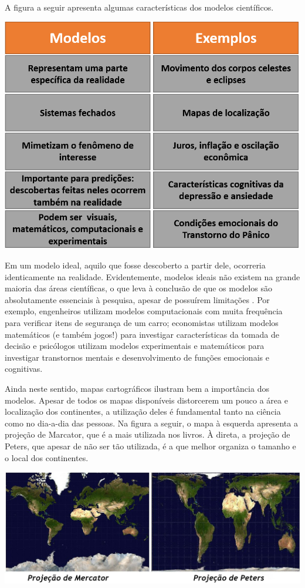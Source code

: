 \documentclass[
]{book}
\begin{document}
A figura a seguir apresenta algumas características dos modelos científicos.

\includegraphics{./img/cap_modelos_cientificos.png}

Em um modelo ideal, aquilo que fosse descoberto a partir dele, ocorreria identicamente na realidade. Evidentemente, modelos ideais não existem na grande maioria das áreas científicas, o que leva à conclusão de que os modelos são absolutamente essenciais à pesquisa, apesar de possuírem limitações \citep{Putnam1980, Feigelson1992, Firgg2020}. Por exemplo, engenheiros utilizam modelos computacionais com muita frequência para verificar itens de segurança de um carro; economistas utilizam modelos matemáticos (e também jogos!) para investigar características da tomada de decisão e psicólogos utilizam modelos experimentais e matemáticos para investigar transtornos mentais e desenvolvimento de funções emocionais e cognitivas.

Ainda neste sentido, mapas cartográficos ilustram bem a importância dos modelos. Apesar de todos os mapas disponíveis distorcerem um pouco a área e localização dos continentes, a utilização deles é fundamental tanto na ciência como no dia-a-dia das pessoas. Na figura a seguir, o mapa à esquerda apresenta a projeção de Marcator, que é a mais utilizada nos livros. À direta, a projeção de Peters, que apesar de não ser tão utilizada, é a que melhor organiza o tamanho e o local dos continentes.

\includegraphics{./img/cap_mapas.png}
\end{document}
